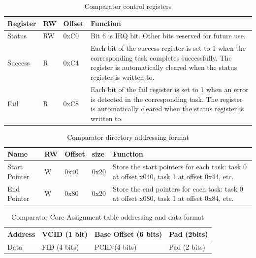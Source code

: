 \begin{table}
\centering
    \begin{tabular}{| l | l | l | p{8cm} |}
    \hline
    Register & RW & Offset & Function\\ \hline
    Status & RW & 0xC0 & Bit 6 is IRQ bit. Other bits reserved for future use.\\ \hline
    Success  & R & 0xC4 & Each bit of the success register is set to 1 when the corresponding task completes successfully. The register is automatically cleared when the status register is written to.\\ \hline
    Fail & R & 0xC8 & Each bit of the fail register is set to 1 when an error is detected in the corresponding task. The register is automatically cleared when the status register is written to.\\ \hline
    \end{tabular}
    \caption{Comparator control registers}
    \label{t:comp_reg}
\end{table}
\begin{table}
\centering
    \begin{tabular}{| l | l | l | l | p{6cm} |}
    \hline
    Name & RW & Offset & size & Function\\ \hline
    Start Pointer & W & 0x40 & 0x20 & Store the start pointers for each task: task 0 at offset x040, task 1 at offset 0x44, etc.\\ \hline
    End Pointer & W & 0x80 & 0x20 & Store the end pointers for each task: task 0 at offset x080, task 1 at offset 0x84, etc.\\ \hline
    \end{tabular}
    \caption{Comparator directory addressing format}
    \label{t:dir_format}
\end{table}

\begin{table}
\centering
    \begin{tabular}{| l | l | l | l |}
    \hline
    Address & VCID (1 bit) & Base Offset (6 bits) & Pad (2bits)\\ \hline
    Data & FID (4 bits) & PCID (4 bits) & Pad (2 bits)\\ \hline
    \end{tabular}
    \caption{Comparator Core Assignment table addressing and data format}
    \label{t:cat_format}
\end{table}

